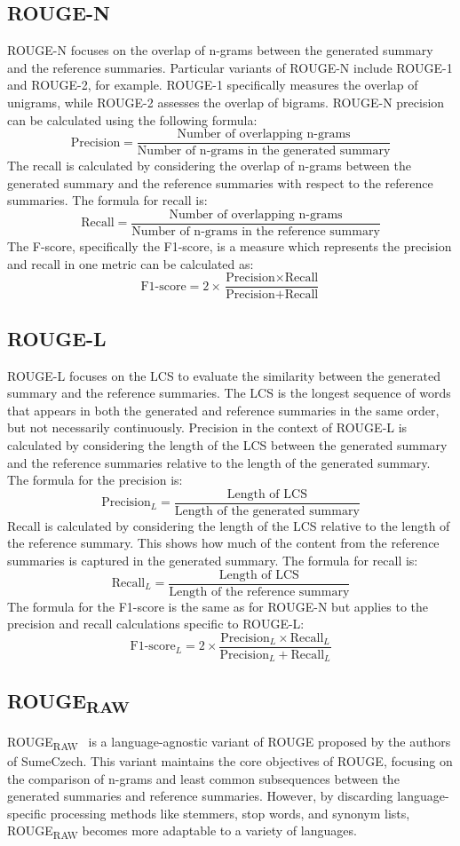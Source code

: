 \documentclass[english, ba, kiv, he, iso690numb, pdf, viewonly]{fasthesis}
\begin{document}
\subsection{ROUGE-N}
ROUGE-N focuses on the overlap of n-grams between the generated summary and the reference summaries. Particular variants of ROUGE-N include ROUGE-1 and ROUGE-2, for example. ROUGE-1 specifically measures the overlap of unigrams, while ROUGE-2 assesses the overlap of bigrams. ROUGE-N precision can be calculated using the following formula:
$$ \text{Precision} = \frac{\text{Number of overlapping n-grams}}{\text{Number of n-grams in the generated summary}} $$
The recall is calculated by considering the overlap of n-grams between the generated summary and the reference summaries with respect to the reference summaries. The formula for recall is:
$$
\text{Recall} = \frac{\text{Number of overlapping n-grams}}{\text{Number of n-grams in the reference summary}}
$$
The F-score, specifically the F1-score, is a measure which represents the precision and recall in one metric can be calculated as:
$$
\text{F1-score} = 2 \times \frac{\text{Precision} \times \text{Recall}}{\text{Precision} + \text{Recall}}
$$
\subsection{ROUGE-L}
ROUGE-L focuses on the LCS to evaluate the similarity between the generated summary and the reference summaries. The LCS is the longest sequence of words that appears in both the generated and reference summaries in the same order, but not necessarily continuously. 
Precision in the context of ROUGE-L is calculated by considering the length of the LCS between the generated summary and the reference summaries relative to the length of the generated summary. The formula for the precision is:
$$
\text{Precision}_{L} = \frac{\text{Length of LCS}}{\text{Length of the generated summary}}
$$
Recall is calculated by considering the length of the LCS relative to the length of the reference summary. This shows how much of the content from the reference summaries is captured in the generated summary. The formula for recall is:
$$
\text{Recall}_{L} = \frac{\text{Length of LCS}}{\text{Length of the reference summary}}
$$
The formula for the F1-score is the same as for ROUGE-N but applies to the precision and recall calculations specific to ROUGE-L:
$$
\text{F1-score}_{L} = 2 \times \frac{\text{Precision}_{L} \times \text{Recall}_{L}}{\text{Precision}_{L} + \text{Recall}_{L}}
$$
\subsection{ROUGE\textsubscript{RAW}}
ROUGE\textsubscript{RAW}~\cite{straka-etal-2018-sumeczech} is a language-agnostic variant of ROUGE proposed by the authors of SumeCzech. This variant maintains the core objectives of ROUGE, focusing on the comparison of n-grams and least common subsequences between the generated summaries and reference summaries. However, by discarding language-specific processing methods like stemmers, stop words, and synonym lists, ROUGE\textsubscript{RAW} becomes more adaptable to a variety of languages.
\end{document}
